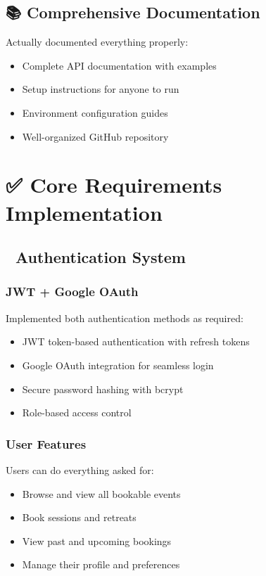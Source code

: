 \documentclass[12pt,a4paper]{article}
\begin{document}
\subsection{📚 Comprehensive Documentation}
Actually documented everything properly:
\begin{itemize}
    \item Complete API documentation with examples
    \item Setup instructions for anyone to run
    \item Environment configuration guides
    \item Well-organized GitHub repository
\end{itemize}

\section{✅ Core Requirements Implementation}

\subsection{🔐 Authentication System}
\subsubsection{JWT + Google OAuth}
Implemented both authentication methods as required:
\begin{itemize}
    \item JWT token-based authentication with refresh tokens
    \item Google OAuth integration for seamless login
    \item Secure password hashing with bcrypt
    \item Role-based access control
\end{itemize}

\subsubsection{User Features}
Users can do everything asked for:
\begin{itemize}
    \item Browse and view all bookable events
    \item Book sessions and retreats
    \item View past and upcoming bookings
    \item Manage their profile and preferences
\end{itemize}
\end{document}
